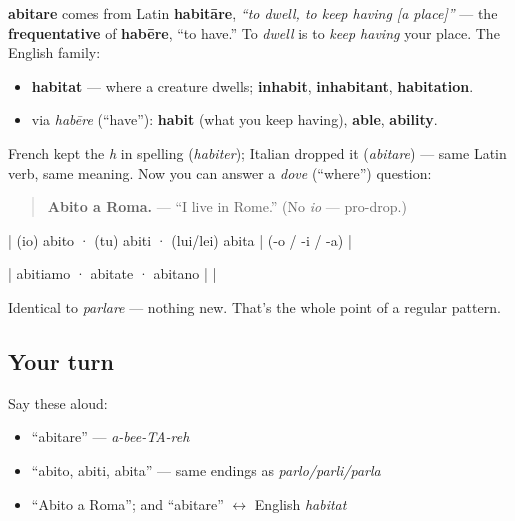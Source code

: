 \begin{cousinweb}
\textbf{abitare} comes from Latin \textbf{habitāre}, \emph{\textquotedblleft{}to dwell, to keep having {[}a place{]}\textquotedblright{}} — the \textbf{frequentative} of \textbf{habēre}, \textquotedblleft{}to have.\textquotedblright{} To \emph{dwell} is to \emph{keep having} your place. The English family:

\begin{itemize}
\raggedright
  \item \textbf{habitat} — where a creature dwells; \textbf{inhabit}, \textbf{inhabitant}, \textbf{habitation}.
  \item via \emph{habēre} (\textquotedblleft{}have\textquotedblright{}): \textbf{habit} (what you keep having), \textbf{able}, \textbf{ability}.
\end{itemize}

French kept the \emph{h} in spelling (\emph{habiter}); Italian dropped it (\emph{abitare}) — same Latin verb, same meaning. Now you can answer a \emph{dove} (\textquotedblleft{}where\textquotedblright{}) question:

\begin{quote}
\textbf{Abito a Roma.} — \textquotedblleft{}I live in Rome.\textquotedblright{} (No \emph{io} — pro-drop.)
\end{quote}
\end{cousinweb}

\begin{grammarlens}[title={Grammar Lens: same -are template}]
| (io) abito · (tu) abiti · (lui/lei) abita | (-o / -i / -a) |

| abitiamo · abitate · abitano |  |

Identical to \emph{parlare} — nothing new. That's the whole point of a regular pattern.
\end{grammarlens}

\subsection*{Your turn}
Say these aloud:

\begin{itemize}
\raggedright
  \item \textquotedblleft{}abitare\textquotedblright{} — \emph{a-bee-TA-reh}
  \item \textquotedblleft{}abito, abiti, abita\textquotedblright{} — same endings as \emph{parlo/parli/parla}
  \item \textquotedblleft{}Abito a Roma\textquotedblright{}; and \textquotedblleft{}abitare\textquotedblright{} $\leftrightarrow$ English \emph{habitat}
\end{itemize}


